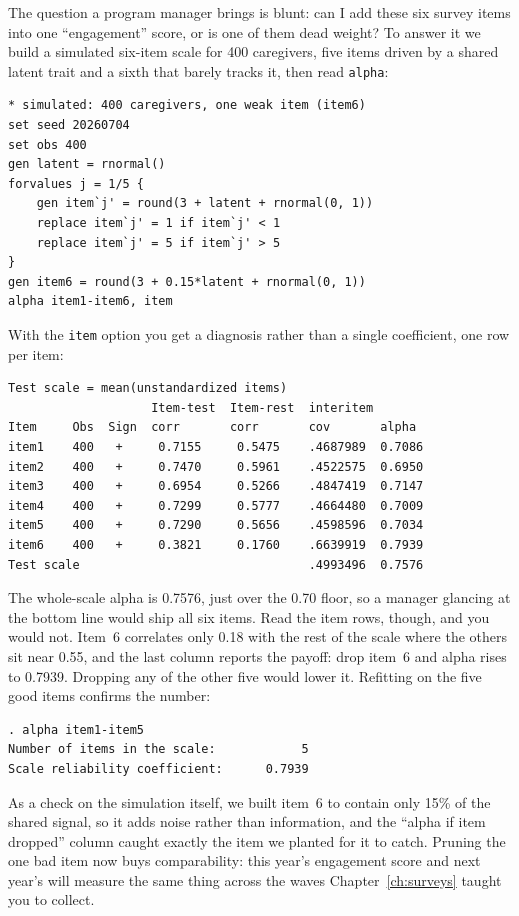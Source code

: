 \documentclass[
    a4paper,
    fontsize=10pt,
    twoside=true,
    numbers=noenddot,
]{kaobook}
\begin{document}
The question a program manager brings is blunt: can I add these six survey items into one \enquote{engagement} score, or is one of them dead weight? To answer it we build a simulated six-item scale for 400 caregivers, five items driven by a shared latent trait and a sixth that barely tracks it, then read \texttt{alpha}:
\par
{\footnotesize
\begin{verbatim}
* simulated: 400 caregivers, one weak item (item6)
set seed 20260704
set obs 400
gen latent = rnormal()
forvalues j = 1/5 {
    gen item`j' = round(3 + latent + rnormal(0, 1))
    replace item`j' = 1 if item`j' < 1
    replace item`j' = 5 if item`j' > 5
}
gen item6 = round(3 + 0.15*latent + rnormal(0, 1))
alpha item1-item6, item
\end{verbatim}
}
With the \texttt{item} option you get a diagnosis rather than a single coefficient, one row per item:
\par
{\footnotesize
\begin{verbatim}
Test scale = mean(unstandardized items)
                    Item-test  Item-rest  interitem
Item     Obs  Sign  corr       corr       cov       alpha
item1    400   +     0.7155     0.5475    .4687989  0.7086
item2    400   +     0.7470     0.5961    .4522575  0.6950
item3    400   +     0.6954     0.5266    .4847419  0.7147
item4    400   +     0.7299     0.5777    .4664480  0.7009
item5    400   +     0.7290     0.5656    .4598596  0.7034
item6    400   +     0.3821     0.1760    .6639919  0.7939
Test scale                                .4993496  0.7576
\end{verbatim}
}
The whole-scale alpha is 0.7576, just over the 0.70 floor, so a manager glancing at the bottom line would ship all six items. Read the item rows, though, and you would not. Item~6 correlates only 0.18 with the rest of the scale where the others sit near 0.55, and the last column reports the payoff: drop item~6 and alpha rises to 0.7939. Dropping any of the other five would lower it. Refitting on the five good items confirms the number:
\par
{\footnotesize
\begin{verbatim}
. alpha item1-item5
Number of items in the scale:            5
Scale reliability coefficient:      0.7939
\end{verbatim}
}
As a check on the simulation itself, we built item~6 to contain only 15\% of the shared signal, so it adds noise rather than information, and the \enquote{alpha if item dropped} column caught exactly the item we planted for it to catch. Pruning the one bad item now buys comparability: this year's engagement score and next year's will measure the same thing across the waves Chapter~\ref{ch:surveys} taught you to collect.
\end{document}

